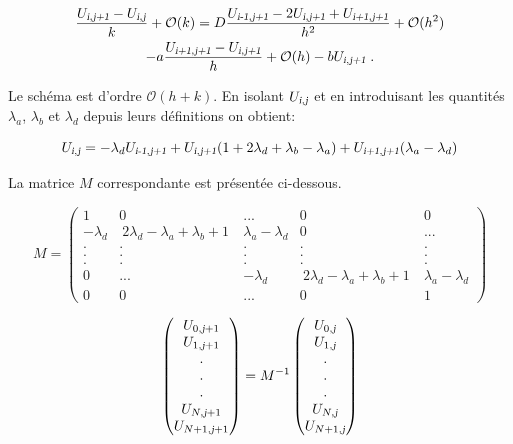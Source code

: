 \documentclass[a4paper, 12pt]{report}
\begin{document}
\begin{multline}
\frac{U_{\textsl{i},\textsl{j+1}} - U_{\textsl{i},\textsl{j}}}{k} + \mathcal{O}(k)  = D \frac{U_{\textsl{i-1},\textsl{j+1}} - 2 U_{\textsl{i},\textsl{j+1}} + U_{\textsl{i+1},\textsl{j+1}}}{h^2}+ \mathcal{O}(h^2) \\
- a \frac{U_{\textsl{i+1},\textsl{j+1}} - U_{\textsl{i},\textsl{j+1}}}{h} + \mathcal{O}(h) - b U_{\textsl{i},\textsl{j+1}}\;.
\end{multline}

Le schéma est d'ordre $\mathcal{O}(h+k)$. En isolant $U_{\textsl{i},\textsl{j}}$
et en introduisant les quantités $\lambda_a$, $\lambda_b$ et $\lambda_d$ depuis
leurs définitions on obtient:

\begin{equation}
  U_{\textsl{i},\textsl{j}} = - \lambda_d U_{\textsl{i-1},\textsl{j+1}}
  +U_{\textsl{i},\textsl{j+1}} (1+ 2 \lambda_d + \lambda_b - \lambda_a)
  +U_{\textsl{i+1},\textsl{j+1}} (\lambda_a - \lambda_d)
\end{equation}

La matrice $M$ correspondante est présentée ci-dessous.

\begin{equation}
  M =
  \begin{pmatrix}
     1 & 0 & ... & 0 & 0 \\
     -\lambda_d & \ 2 \lambda_d - \lambda_a + \lambda_b + 1 \ & \lambda_a-\lambda_d &  0 & ...\\
     . & . & . &  . & .\\
     . & . & . &  . & .\\
     . & . & . &  . & .\\
     0 & ... & -\lambda_d & \ 2 \lambda_d - \lambda_a + \lambda_b + 1 \ & \lambda_a-\lambda_d\\
     0 & 0 & ... & 0 & 1
  \end{pmatrix}
\end{equation}

\begin{equation}
\begin{pmatrix}
   U_{0,\textsl{j}+1} \\
   U_{1,\textsl{j}+1} \\
   .\\
   .\\
   .\\
   U_{N,\textsl{j}+1}\\
   U_{N+1,\textsl{j}+1}
\end{pmatrix}
=
M^{-1}
\begin{pmatrix}
   U_{0,\textsl{j}} \\
   U_{1,\textsl{j}} \\
   .\\
   .\\
   .\\
   U_{N,\textsl{j}}\\
   U_{N+1,\textsl{j}}
\end{pmatrix}
\end{equation}
\end{document}
